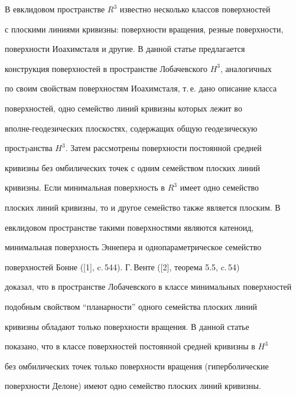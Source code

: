 

\maketitle


\label{begin}





В евклидовом пространстве $R^3$ известно несколько классов поверхностей


с плоскими линиями кривизны: поверхности вращения, резные поверхности,


поверхности Иоахимсталя и другие. В данной статье предлагается


конструкция поверхностей в пространстве Лобачевского $H^3$, аналогичных


по своим свойствам поверхностям Иоахимсталя, т.\,е. дано описание класса


поверхностей, одно семейство линий кривизны которых лежит во


вполне-геодезических плоскостях, содержащих общую геодезическую


простpанства $H^3$. Затем рассмотрены поверхности постоянной средней


кривизны без омбилических точек с одним семейством плоских линий


кривизны. Если минимальная поверхность в $R^3$ имеет одно семейство


плоских линий кривизны, то и другое семейство также является плоским. В


евклидовом пространстве такими поверхностями являются катеноид,


минимальная поверхность Эннепера и однопараметрическое семейство


поверхностей Бонне ([1], c.\,544). Г.\,Венте ([2], теорема 5.5, c.\,54)


доказал, что в пространстве Лобачевского в классе минимальных поверхностей


подобным свойством ``планарности'' одного семейства плоских линий


кривизны обладают только поверхности вращения. В данной статье


показано, что в классе поверхностей постоянной средней кривизны в $H^3$


без омбилических точек только поверхности вращения (гиперболические


поверхности Делоне) имеют одно семейство плоских линий кривизны.



